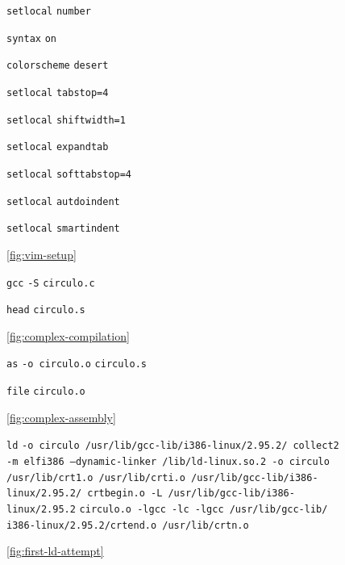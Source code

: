 \documentclass[11pt]{article}
\newcommand{\codetext}[2]{\large\texttt{\textcolor{#1}{#2}}}
\newcommand{\imagecaption}[1]{\vspace{-7pt}\caption*{\char91\ref{fig:#1}\char93}}
\begin{document}
		\begin{figure}[H]
			\centering
			\begin{code-box}
				\codetext{light-blue}{setlocal} \codetext{light-red}{number}
				
				\codetext{light-blue}{syntax} \codetext{light-red}{on}

				\codetext{light-blue}{colorscheme} \codetext{light-red}{desert}
				
				\codetext{light-blue}{setlocal} \codetext{light-red}{tabstop=4}

				\codetext{light-blue}{setlocal} \codetext{light-red}{shiftwidth=1}
				
				\codetext{light-blue}{setlocal} \codetext{light-red}{expandtab}
				
				\codetext{light-blue}{setlocal} \codetext{light-red}{softtabstop=4}
				
				\codetext{light-blue}{setlocal} \codetext{light-red}{autdoindent}
				
				\codetext{light-blue}{setlocal} \codetext{light-red}{smartindent}
			\end{code-box}
			\imagecaption{vim-setup}
		\end{figure}
		
		\begin{figure}[H]
			\centering
			\begin{code-box}
				\codetext{light-blue}{gcc} \codetext{orange-desert-vim}{-S} \codetext{light-red}{circulo.c}
				
				\codetext{light-blue}{head} \codetext{light-red}{circulo.s}
			\end{code-box}
			\imagecaption{complex-compilation}
		\end{figure}
		
		\begin{figure}[H]
			\centering
			\begin{code-box}
				\codetext{light-blue}{as} \codetext{orange-desert-vim}{-o circulo.o} \codetext{light-red}{circulo.s}
				
				\codetext{light-blue}{file} \codetext{light-red}{circulo.o}
			\end{code-box}
			\imagecaption{complex-assembly}
		\end{figure}
		
		\begin{figure}[H]
			\centering
			\begin{code-box}
			\codetext{light-blue}{ld} \codetext{orange-desert-vim}{-o circulo /usr/lib/gcc-lib/i386-linux/2.95.2/ collect2 -m elf\textunderscore{}i386 --dynamic-linker /lib/ld-linux.so.2 -o circulo /usr/lib/crt1.o /usr/lib/crti.o /usr/lib/gcc-lib/i386-linux/2.95.2/ crtbegin.o -L /usr/lib/gcc-lib/i386-linux/2.95.2} \codetext{light-red}{circulo.o }\codetext{orange-desert-vim}{-lgcc -lc -lgcc /usr/lib/gcc-lib/ i386-linux/2.95.2/crtend.o /usr/lib/crtn.o}
			\end{code-box}
			\imagecaption{first-ld-attempt}
		\end{figure}
		
\end{document}
